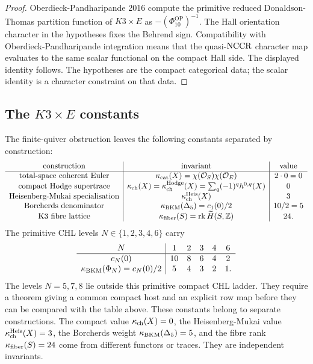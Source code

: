 \begin{proof}
Oberdieck-Pandharipande 2016 compute the primitive reduced
Donaldson-Thomas partition function of \(K3\times E\) as
\(-(\Phi_{10}^{\mathrm{OP}})^{-1}\).  The Hall orientation character
in the hypotheses fixes the Behrend sign.  Compatibility with
Oberdieck-Pandharipande integration means that the quasi-\(\mathrm{NCCR}\)
character map evaluates to the same scalar functional on the compact
Hall side.  The displayed identity follows.  The hypotheses are the
compact categorical data; the scalar identity is a character constraint
on that data.
\end{proof}

\subsection*{The \(K3\times E\) constants}

The finite-quiver obstruction leaves the following constants separated
by construction:
\[
\begin{array}{c|c|c}
\hbox{construction} & \hbox{invariant} & \hbox{value} \\
\hline
\hbox{total-space coherent Euler} &
\kappa_{\mathrm{cat}}(X)=\chi(\mathcal{O}_S)\chi(\mathcal{O}_E) & 2\cdot 0=0 \\
\hbox{compact Hodge supertrace} &
\kappa_{\mathrm{ch}}(X)=\kappa_{\mathrm{ch}}^{\mathrm{Hodge}}(X)=\sum_q(-1)^qh^{0,q}(X) & 0 \\
\hbox{Heisenberg-Mukai specialisation} &
\kappa_{\mathrm{ch}}^{\mathrm{Heis}}(X) & 3 \\
\hbox{Borcherds denominator} &
\kappa_{\mathrm{BKM}}(\Delta_5)=c_1(0)/2 & 10/2=5 \\
\hbox{K3 fibre lattice} &
\kappa_{\mathrm{fiber}}(S)=\operatorname{rk}\widetilde H(S,\mathbb Z) & 24 .
\end{array}
\]
The primitive CHL levels \(N\in\{1,2,3,4,6\}\) carry
\[
\begin{array}{c|ccccc}
N & 1 & 2 & 3 & 4 & 6\\
\hline
c_N(0) & 10 & 8 & 6 & 4 & 2\\
\kappa_{\mathrm{BKM}}(\Phi_N)=c_N(0)/2 & 5 & 4 & 3 & 2 & 1 .
\end{array}
\]
The levels \(N=5,7,8\) lie outside this primitive compact CHL ladder.
They require a theorem giving a common compact host and an explicit row
map before they can be compared with the table above.
These constants belong to separate constructions.  The compact value
\(\kappa_{\mathrm{ch}}(X)=0\), the Heisenberg-Mukai value \(\kappa_{\mathrm{ch}}^{\mathrm{Heis}}(X)=3\), the
Borcherds weight \(\kappa_{\mathrm{BKM}}(\Delta_5)=5\), and the fibre rank
\(\kappa_{\mathrm{fiber}}(S)=24\) come from different functors or traces.  They are
independent invariants.

